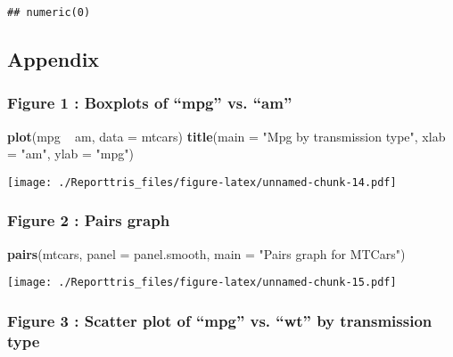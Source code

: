 \documentclass[a3paper]{article}
\newenvironment{Shaded}{\begin{snugshade}}{\end{snugshade}}
\newcommand{\KeywordTok}[1]{\textcolor[rgb]{0.13,0.29,0.53}{\textbf{{#1}}}}
\newcommand{\DataTypeTok}[1]{\textcolor[rgb]{0.13,0.29,0.53}{{#1}}}
\newcommand{\StringTok}[1]{\textcolor[rgb]{0.31,0.60,0.02}{{#1}}}
\newcommand{\NormalTok}[1]{{#1}}
\begin{document}
\begin{verbatim}
## numeric(0)
\end{verbatim}

\subsection{Appendix}\label{appendix}

\subsubsection{Figure 1 : Boxplots of ``mpg'' vs.
``am''}\label{figure-1-boxplots-of-mpg-vs.-am}

\begin{Shaded}
\begin{Highlighting}[]
\KeywordTok{plot}\NormalTok{(mpg ~}\StringTok{ }\NormalTok{am, }\DataTypeTok{data =} \NormalTok{mtcars)}
\KeywordTok{title}\NormalTok{(}\DataTypeTok{main =} \StringTok{"Mpg by transmission type"}\NormalTok{, }\DataTypeTok{xlab =} \StringTok{"am"}\NormalTok{, }\DataTypeTok{ylab =} \StringTok{"mpg"}\NormalTok{)}
\end{Highlighting}
\end{Shaded}

\texttt{[image: ./Reporttris\_files/figure-latex/unnamed-chunk-14.pdf]}

\subsubsection{Figure 2 : Pairs graph}\label{figure-2-pairs-graph}

\begin{Shaded}
\begin{Highlighting}[]
\KeywordTok{pairs}\NormalTok{(mtcars, }\DataTypeTok{panel =} \NormalTok{panel.smooth, }\DataTypeTok{main =} \StringTok{"Pairs graph for MTCars"}\NormalTok{)}
\end{Highlighting}
\end{Shaded}

\texttt{[image: ./Reporttris\_files/figure-latex/unnamed-chunk-15.pdf]}

\subsubsection{Figure 3 : Scatter plot of ``mpg'' vs. ``wt'' by
transmission
type}\label{figure-3-scatter-plot-of-mpg-vs.-wt-by-transmission-type}
\end{document}
